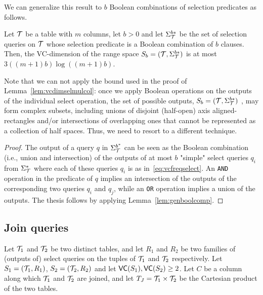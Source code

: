 We can generalize this result to $b$ Boolean combinations of selection
predicates as follows.

\begin{lemma}\label{lem:vcdimselgen}
  Let ${\cal T}$ be a table with $m$ columns, let $b>0$ and let $\Sigma^{b*}_{\cal T}$
  be the set of selection queries on ${\cal T}$ whose selection predicate is a
  Boolean combination of $b$ clauses. Then, the VC-dimension of the range space
  $S_b = ({\cal T}, \Sigma^{b*}_{\cal T})$ is at most $3((m+1)b)\log((m+1)b)$.  
\end{lemma}

Note that we can not apply the bound
used in the proof of Lemma~\ref{lem:vcdimselmulcol}: %
once we apply Boolean operations on the outputs of the individual select
operation, the set of possible outputs, $S_b = ({\cal T}, \Sigma^{b*}_{\cal T})$ , may
form complex subsets, including unions of disjoint (half-open) axis
aligned-rectangles and/or intersections of overlapping ones that cannot be
represented as a collection of half spaces. Thus, we need to resort to a
different technique.

\begin{proof} 
 The output of a query $q$ in $\Sigma^{b^*}_{\cal T}$ can be seen as the Boolean
 combination (i.e., union and intersection) of the outputs of at most $b$
 "simple" select queries $q_i$ from $\Sigma^{*}_{\cal T}$ where each of these
 queries $q_i$ is as in~\eqref{eq:vcfreqselect}. An \texttt{AND} operation in the
 predicate of $q$ implies an intersection of the outputs of  the corresponding
 two queries $q_i$ and $q_j$, while an \texttt{OR} operation implies a union of
 the outputs. The thesis follows by applying Lemma~\ref{lem:genboolcomp}.
\end{proof}

\subsection{Join queries}\label{sec:vcfreqvcdimjoinqueries}
Let ${\cal T}_1$ and ${\cal T}_2$ be two distinct tables, and let $R_1$ and $R_2$
be two families of (outputs of) select queries on the tuples of ${\cal T}_1$ and
${\cal T}_2$ respectively. Let $S_1=({\cal T}_1,R_1)$, $S_2=({\cal T}_2,R_2)$ and let
$\mathsf{VC}(S_1),\mathsf{VC}(S_2)\geq 2$. Let $C$ be a column along which ${\cal T}_1$ and ${\cal T}_2$
are joined, and let $T_J={\cal T}_1\times{\cal T}_2$ be the Cartesian product of the two
tables.

